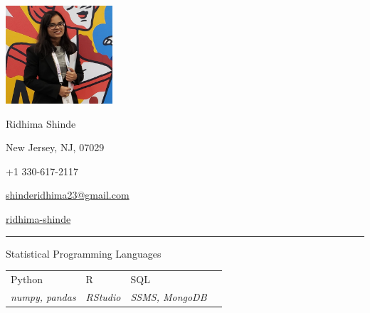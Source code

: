 \documentclass[a4paper,10pt]{article}
\newlength{\cvcolumngapwidth}
\newlength{\cvleftcolumnwidth}
\newlength{\cvrightcolumnwidth}
\newcommand{\cvnamestyle}[1]{{\Large\cvnamefont\textcolor{cvnamecolor}{#1}}}
\newcommand{\cvsectionstyle}[1]{{\normalsize\cvsectionfont\textcolor{cvsectioncolor}{#1}}}
\newcommand{\cvheadingstyle}[1]{{\normalsize\cvheadingfont\textcolor{cvheadingcolor}{#1}}}
\newlength{\cvafteritemskipamount}
\newlength{\cvaftersectionskipamount}
\newlength{\cvbetweensectionandheadingextraskipamount}
\newlength{\cvafternameskipamount}
\newlength{\cvafterpersonalinfolineskipamount}
\newlength{\cvparskip}
\newcommand{\cvpersonalinfo}[2]{
    \begin{minipage}[t]{\cvleftcolumnwidth}
        \vspace{0mm} %
        \raggedleft #1
    \end{minipage}%
    \hspace{\cvcolumngapwidth}%
    \begin{minipage}[t]{\cvrightcolumnwidth}
        \vspace{0mm} %
        #2
    \end{minipage}

    \vspace{\cvafteritemskipamount}
}
\newcommand{\cvname}[1]{
    \cvnamestyle{#1}

    \vspace{\cvafternameskipamount}
}
\newcommand{\cvpersonalinfolinewithicon}[3]{
    \raisebox{.5\fontcharht\font`E-.5\height}{\texttt{[image: \#2]}}
    #3

    \vspace{\cvafterpersonalinfolineskipamount}
}
\newcommand{\cvsection}[1]{
    \begin{minipage}[t]{\cvleftcolumnwidth}
        \raggedleft\cvsectionstyle{#1}
    \end{minipage}%
    \hspace{\cvcolumngapwidth}%
    \begin{minipage}[t]{\cvrightcolumnwidth}
        \textcolor{cvrulecolor}{\rule{\cvrightcolumnwidth}{0.3mm}}
    \end{minipage}

    \vspace{\cvaftersectionskipamount}
}
\newcommand{\cvitem}[2]{
    \begin{minipage}[t]{\cvleftcolumnwidth}
        \raggedleft #1
    \end{minipage}%
    \hspace{\cvcolumngapwidth}%
    \begin{minipage}[t]{\cvrightcolumnwidth}
        \setlength{\parskip}{\cvparskip} #2
    \end{minipage}

    \vspace{\cvafteritemskipamount}
}
\begin{document}

\cvpersonalinfo{
    \includegraphics[height=36.5mm]{Profile picture.PNG}
    }{
    \cvname{Ridhima Shinde}

    \cvpersonalinfolinewithicon{height=4mm}{072-location.pdf}{
        New Jersey, NJ, 07029 
    }

    \cvpersonalinfolinewithicon{height=4mm}{067-phone.pdf}{
        +1 330-617-2117
    }

    \cvpersonalinfolinewithicon{height=4mm}{070-envelop.pdf}{
        \href{mailto:shinderidhima23@gmail.com}{shinderidhima23@gmail.com}
    }

    \cvpersonalinfolinewithicon{height=4mm}{458-linkedin.pdf}{
        \href{https://www.linkedin.com/in/ridhima-shinde/}{ridhima-shinde}
    }
 
    
   
    
}


\cvsection{\textbf{SKILLS}}

\vspace{\cvbetweensectionandheadingextraskipamount}


\cvitem{
    \cvheadingstyle{Statistical Programming Languages}
    
}{  
        \setlength\tabcolsep{5pt}
        \begin{tabular}{|l|l|l|l|}

        Python   & R   & SQL    \\
        \footnotesize{\emph{numpy, pandas }} &
        \footnotesize{\emph{RStudio }} &
        \footnotesize{\emph{SSMS, MongoDB}}\\
        
     
         
         
        \end{tabular}
}
\end{document}
